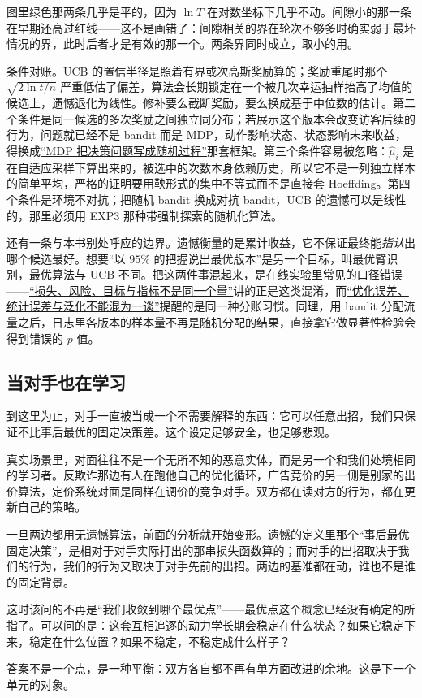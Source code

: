 图里绿色那两条几乎是平的，因为 \(\ln T\) 在对数坐标下几乎不动。间隙小的那一条在早期还高过红线——这不是画错了：间隙相关的界在轮次不够多时确实弱于最坏情况的界，此时后者才是有效的那一个。两条界同时成立，取小的用。

条件对账。UCB 的置信半径是照着有界或次高斯奖励算的；奖励重尾时那个 \(\sqrt{2\ln t/n}\) 严重低估了偏差，算法会长期锁定在一个被几次幸运抽样抬高了均值的候选上，遗憾退化为线性。修补要么截断奖励，要么换成基于中位数的估计。第二个条件是同一候选的多次奖励之间独立同分布；若展示这个版本会改变访客后续的行为，问题就已经不是 bandit 而是 MDP，动作影响状态、状态影响未来收益，得换成\hyperref[sec:16-Control-and-Reinforcement-Learning/02-Reinforcement-Learning/01]{``MDP 把决策问题写成随机过程''}那套框架。第三个条件容易被忽略：\(\hat\mu_i\) 是在自适应采样下算出来的，被选中的次数本身依赖历史，所以它不是一列独立样本的简单平均，严格的证明要用鞅形式的集中不等式而不是直接套 Hoeffding。第四个条件是环境不对抗；把随机 bandit 换成对抗 bandit，UCB 的遗憾可以是线性的，那里必须用 EXP3 那种带强制探索的随机化算法。

还有一条与本书别处呼应的边界。遗憾衡量的是累计收益，它不保证最终能\emph{指认}出哪个候选最好。想要``以 \(95\%\) 的把握说出最优版本''是另一个目标，叫最优臂识别，最优算法与 UCB 不同。把这两件事混起来，是在线实验里常见的口径错误——\hyperref[sec:13-Machine-Learning/01-Learning-Problems-and-Evaluation/02]{``损失、风险、目标与指标不是同一个量''}讲的正是这类混淆，而\hyperref[sec:09-Convex-Optimization/08-Nonconvex-and-Stochastic-Optimization/06]{``优化误差、统计误差与泛化不能混为一谈''}提醒的是同一种分账习惯。同理，用 bandit 分配流量之后，日志里各版本的样本量不再是随机分配的结果，直接拿它做显著性检验会得到错误的 \(p\) 值。

\subsection{当对手也在学习}

到这里为止，对手一直被当成一个不需要解释的东西：它可以任意出招，我们只保证不比事后最优的固定决策差。这个设定足够安全，也足够悲观。

真实场景里，对面往往不是一个无所不知的恶意实体，而是另一个和我们处境相同的学习者。反欺诈那边有人在跑他自己的优化循环，广告竞价的另一侧是别家的出价算法，定价系统对面是同样在调价的竞争对手。双方都在读对方的行为，都在更新自己的策略。

一旦两边都用无遗憾算法，前面的分析就开始变形。遗憾的定义里那个``事后最优固定决策''，是相对于对手实际打出的那串损失函数算的；而对手的出招取决于我们的行为，我们的行为又取决于对手先前的出招。两边的基准都在动，谁也不是谁的固定背景。

这时该问的不再是``我们收敛到哪个最优点''——最优点这个概念已经没有确定的所指了。可以问的是：这套互相追逐的动力学长期会稳定在什么状态？如果它稳定下来，稳定在什么位置？如果不稳定，不稳定成什么样子？

答案不是一个点，是一种平衡：双方各自都不再有单方面改进的余地。这是下一个单元的对象。
